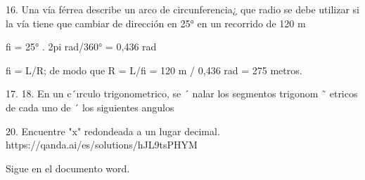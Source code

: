 \documentclass[11pt]{article}
\begin{document}
16.
Una vía férrea describe un arco de circunferencia¿ que radio se debe utilizar si la vía tiene que cambiar de dirección en 25° en un recorrido de 120 m

fi = 25° . 2pi rad/360° = 0,436 rad

fi = L/R; de modo que R = L/fi = 120 m / 0,436 rad = 275 metros.

17. 
18. En un c´ırculo trigonometrico, se ´ nalar los segmentos trigonom ˜ etricos de cada uno de ´
los siguientes angulos

20. Encuentre "x" redondeada a un lugar decimal.
https://qanda.ai/es/solutions/hJL9tsPHYM

Sigue en el documento word.
\end{document}
